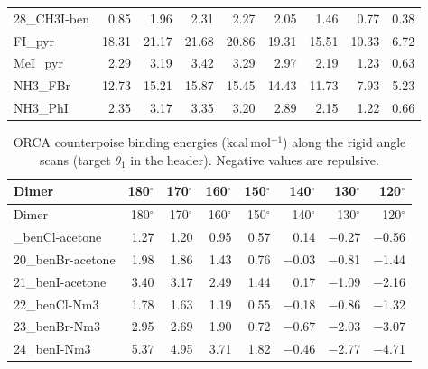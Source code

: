 \documentclass[journal=jcisd8,manuscript=suppinfo]{achemso}
\begin{document}
\begin{singlespace}
{\begin{longtable}{lrrrrrrrr}
28\_CH3I-ben & 0.85 & 1.96 & 2.31 & 2.27 & 2.05 & 1.46 & 0.77 & 0.38\\
FI\_pyr & 18.31 & 21.17 & 21.68 & 20.86 & 19.31 & 15.51 & 10.33 & 6.72\\
MeI\_pyr & 2.29 & 3.19 & 3.42 & 3.29 & 2.97 & 2.19 & 1.23 & 0.63\\
NH3\_FBr & 12.73 & 15.21 & 15.87 & 15.45 & 14.43 & 11.73 & 7.93 & 5.23\\
NH3\_PhI & 2.35 & 3.17 & 3.35 & 3.20 & 2.89 & 2.15 & 1.22 & 0.66\\
\end{longtable}}
{\scriptsize
\setlength{\tabcolsep}{3pt}
\begin{longtable}{lrrrrrrr}
\caption{ORCA counterpoise binding energies (kcal\,mol$^{-1}$) along the rigid angle scans (target $\theta_1$ in the header). Negative values are repulsive.}\label{tab:cpangle}\\
\toprule
Dimer & 180$^\circ$ & 170$^\circ$ & 160$^\circ$ & 150$^\circ$ & 140$^\circ$ & 130$^\circ$ & 120$^\circ$\\
\midrule
\endfirsthead
\toprule
Dimer & 180$^\circ$ & 170$^\circ$ & 160$^\circ$ & 150$^\circ$ & 140$^\circ$ & 130$^\circ$ & 120$^\circ$\\
\midrule
\endhead
\bottomrule
\endlastfoot
19\_benCl-acetone & 1.27 & 1.20 & 0.95 & 0.57 & 0.14 & $-$0.27 & $-$0.56\\
20\_benBr-acetone & 1.98 & 1.86 & 1.43 & 0.76 & $-$0.03 & $-$0.81 & $-$1.44\\
21\_benI-acetone & 3.40 & 3.17 & 2.49 & 1.44 & 0.17 & $-$1.09 & $-$2.16\\
22\_benCl-Nm3 & 1.78 & 1.63 & 1.19 & 0.55 & $-$0.18 & $-$0.86 & $-$1.32\\
23\_benBr-Nm3 & 2.95 & 2.69 & 1.90 & 0.72 & $-$0.67 & $-$2.03 & $-$3.07\\
24\_benI-Nm3 & 5.37 & 4.95 & 3.71 & 1.82 & $-$0.46 & $-$2.77 & $-$4.71\\
\end{longtable}}
\begin{table}[!htbp]\centering\footnotesize
\caption{ORCA counterpoise interaction energies of the protein clusters ($\omega$B97X-V/def2-TZVPD, gas phase, DefGrid3, Sthresh $10^{-6}$). Fragment 1 is the ligand. Fragment 2 holds the acceptor environment. XB: halogen bonds in the model. XB acceptors: their acceptor residues. $q_1$, $q_2$: fragment charges. $N_\mathrm{bf}$: basis functions. $E_\mathrm{int}$ covers all contacts between the fragments (kcal\,mol$^{-1}$). Time: wall time of the AB, A, and B jobs on 40 cores (min).}\label{tab:cpprot}

\end{table}
\end{singlespace}
\end{document}

